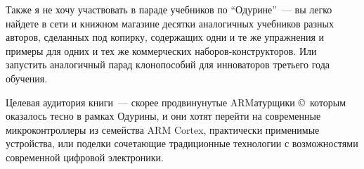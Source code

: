 \clearpage
Также я не хочу участвовать в параде учебников по ``Одурине''\ --- вы легко
найдете в сети и книжном магазине десятки аналогичных учебников разных авторов,
сделанных под копирку, содержащих одни и те же упражнения и примеры для одних и
тех же коммерческих наборов-конструкторов. Или запустить аналогичный парад клонопособий для инноваторов
третьего года обучения. 

Целевая аудитория книги\ --- скорее продвинунутые ARMатурщики \copyright\
которым оказалось тесно в рамках Одурины, и они хотят перейти на современные
микроконтроллеры из семейства ARM Cortex, практически применимые устройства, или
поделки сочетающие традиционные технологии с возможностями современной
цифровой электроники.
